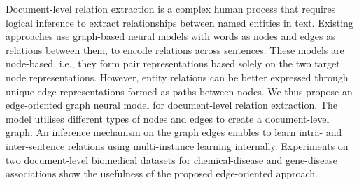 Document-level relation extraction is a complex human process that requires logical inference to extract relationships between named entities in text. Existing approaches use graph-based neural models with words as nodes and edges as relations between them, to encode relations across sentences. These models are node-based, i.e., they form pair representations based solely on the two target node representations. However, entity relations can be better expressed through unique edge representations formed as paths between  nodes. We thus propose an edge-oriented graph neural model for document-level relation extraction. The model utilises different types of nodes and edges to create a document-level graph. An inference mechanism on the graph edges enables to learn intra- and inter-sentence relations using multi-instance learning internally. Experiments on two document-level biomedical datasets for chemical-disease and gene-disease associations show the usefulness of the proposed edge-oriented approach.